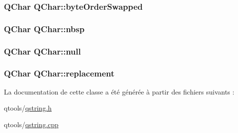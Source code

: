 \subsubsection[{byte\+Order\+Swapped}]{ {\bf Q\+Char} Q\+Char\+::byte\+Order\+Swapped}\label{class_q_char_ada7e951f45ce64ab6a51b9995d82aaf8}
\hypertarget{class_q_char_af63d0090d00cf90fe934fb2554a595cb}{}
\subsubsection[{nbsp}]{ {\bf Q\+Char} Q\+Char\+::nbsp}\label{class_q_char_af63d0090d00cf90fe934fb2554a595cb}
\hypertarget{class_q_char_afdc80b6130ca162603a5bc20ca74942b}{}
\subsubsection[{null}]{ {\bf Q\+Char} Q\+Char\+::null}\label{class_q_char_afdc80b6130ca162603a5bc20ca74942b}
\hypertarget{class_q_char_abdeb014a60f5abbaa2c136f9d746e3a2}{}
\subsubsection[{replacement}]{ {\bf Q\+Char} Q\+Char\+::replacement}\label{class_q_char_abdeb014a60f5abbaa2c136f9d746e3a2}


La documentation de cette classe a été générée à partir des fichiers suivants \+:\begin{DoxyCompactItemize}
\item 
qtools/\hyperlink{qstring_8h}{qstring.\+h}\item 
qtools/\hyperlink{qstring_8cpp}{qstring.\+cpp}\end{DoxyCompactItemize}
